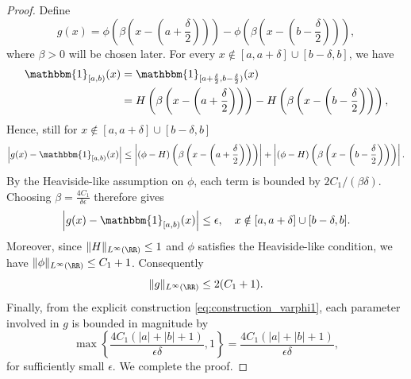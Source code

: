 \documentclass[11pt]{article}
\begin{document}
\begin{proof}
    Define 
    \begin{equation}
        g (x) = \phi \left( \beta \left( x - \left(a + \frac{\delta}{2}\right)\right) \right) - \phi \left( \beta \left( x - \left(b - \frac{\delta}{2}\right)\right) \right),
        \label{eq:construction_varphi1}
    \end{equation}
    where $\beta>0$ will be chosen later.
    For every $x \notin [a, a+ \delta] \cup [b-\delta, b]$, we have 
    \begin{equation*}
        \begin{aligned}
             \mathbbm{1}_{[a,b)} (x) &= \mathbbm{1}_{[a+\frac{\delta}{2},b-\frac{\delta}{2})} (x) \\
             &= H \left( \beta \left( x - \left(a + \frac{\delta}{2}\right)\right)  \right) - H\left( \beta \left( x - \left(b - \frac{\delta}{2}\right)\right)  \right),
        \end{aligned}
    \end{equation*}
    Hence, still for $x \notin [a, a+ \delta] \cup [b-\delta, b]$
    \begin{equation*}
            \left| g(x) - \mathbbm{1}_{[a,b)}(x)\right|  
             \leq \left| (\phi - H) \left( \beta \left( x - \left(a + \frac{\delta}{2}\right)\right)  \right) \right| + \left| (\phi - H) \left( \beta \left( x - \left(b - \frac{\delta}{2}\right)\right)  \right)\right|.
    \end{equation*}
    By the Heaviside-like assumption on $\phi$, each term is bounded by $2C_1 / (\beta \delta)$. Choosing $\beta = \frac{4C_1}{\delta \epsilon}$ therefore gives
    \begin{equation*}
         \left| g(x) - \mathbbm{1}_{[a,b)}(x)\right| \leq \epsilon, \quad x \notin  [a, a+ \delta] \cup [b-\delta, b].
    \end{equation*}
    Moreover, since $\|H\|_{L^{\infty}(\RR)} \leq 1$ and $\phi$ satisfies the Heaviside-like condition, we have $\|\phi\|_{L^{\infty}(\RR)} \leq C_1 + 1$. Consequently
    \begin{equation*}
        \|g\|_{L^{\infty}(\RR)} \leq 2 (C_1 + 1).
    \end{equation*}
    Finally, from the explicit construction \eqref{eq:construction_varphi1}, each parameter involved in $g$ is bounded in magnitude by 
    \begin{equation*}
        \max \left\{ \frac{4C_1 (|a| + |b|+1)}{\epsilon \delta}, 1\right\} = \frac{4C_1 (|a| + |b| + 1)}{\epsilon \delta},
    \end{equation*}
    for sufficiently small $\epsilon$. We complete the proof.
\end{proof}
\end{document}
